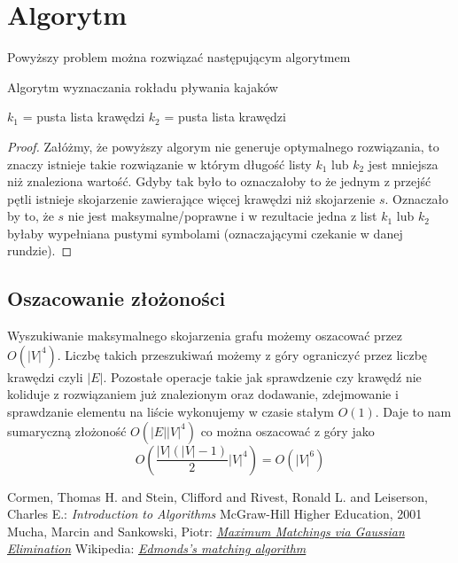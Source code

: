 \documentclass{llncs}
\begin{document}
\section{Algorytm}
Powyższy problem można rozwiązać następującym algorytmem

\begin{algorithm}[H]
 \caption{Algorytm wyznaczania rokładu pływania kajaków}
 $k_1$ = pusta lista krawędzi\;
 $k_2$ = pusta lista krawędzi\;
\end{algorithm}

\begin{proof}
Załóżmy, że powyższy algorym nie generuje optymalnego rozwiązania, to znaczy istnieje
takie rozwiązanie w którym długość listy $k_1$ lub $k_2$ jest mniejsza niż znaleziona wartość.
Gdyby tak było to oznaczałoby to że jednym z przejść pętli istnieje
skojarzenie zawierające więcej krawędzi niż skojarzenie $s$. 
Oznaczało by to, że $s$ nie jest maksymalne/poprawne i w rezultacie jedna z list $k_1$ lub $k_2$ byłaby wypełniana pustymi
symbolami (oznaczającymi czekanie w danej rundzie).
\end{proof}

\subsection{Oszacowanie złożoności}

Wyszukiwanie maksymalnego skojarzenia grafu możemy oszacować przez $O(|V|^4)$\cite{wiki-blossom}.
Liczbę takich przeszukiwań możemy z góry ograniczyć przez liczbę krawędzi czyli $|E|$. 
Pozostałe operacje takie jak sprawdzenie czy krawędź nie koliduje z rozwiązaniem już znalezionym
oraz dodawanie, zdejmowanie i sprawdzanie elementu na liście wykonujemy w czasie stałym $O(1)$.
Daje to nam sumaryczną złożoność $O(|E||V|^4)$ co można oszacować z góry jako 
\begin{equation}
O(\frac{|V|(|V|-1)}{2} |V|^4) = O(|V|^6)
\end{equation}

%
%
\begin{thebibliography}{4}
%
Cormen, Thomas H. and Stein, Clifford and Rivest, Ronald L. and Leiserson, Charles E.:
\textsl{Introduction to Algorithms}
McGraw-Hill Higher Education, 2001
Mucha, Marcin and Sankowski, Piotr:
\textsl{\href{http://www.mimuw.edu.pl/~mucha/pub/mucha_sankowski_focs04.pdf}{Maximum Matchings via Gaussian Elimination}}
Wikipedia:
\textsl{\href{http://en.wikipedia.org/wiki/Blossom_algorithm}{Edmonds's matching algorithm}}
\end{thebibliography}
\end{document}
